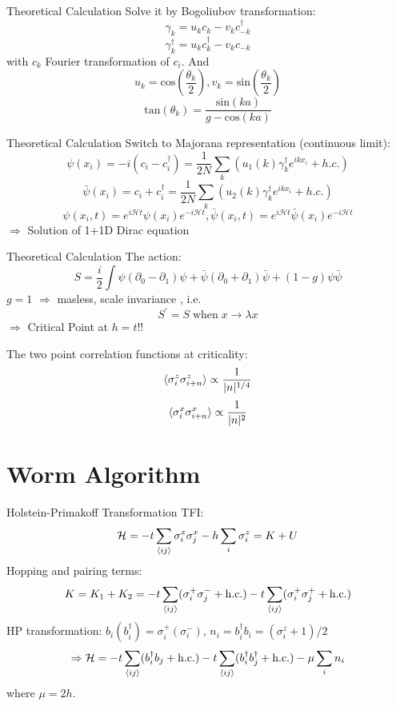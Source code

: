 \documentclass[aspectratio=43]{beamer}
\begin{document}
\begin{frame}{Theoretical Calculation}
Solve it by Bogoliubov transformation:
\[
\gamma_k=u_kc_k-v_kc_{-k}^{\dagger}
\]
\[
\gamma_k^{\dagger}=u_kc_k^{\dagger}-v_kc_{-k}
\]
with $c_k$ Fourier transformation of $c_i$. And
\[
u_k=\mathrm{cos}\left( \frac{\theta_k}{2}\right), v_k=\mathrm{sin}\left( \frac{\theta_k}{2}\right) 
\]
\[
\mathrm{tan}\left(\theta_k\right)=\frac{\mathrm{sin}(ka)}{g-\mathrm{cos}(ka)}
\]
\end{frame}

\begin{frame}{Theoretical Calculation}
Switch to Majorana representation (continuous limit):
\[
\psi(x_i)=-i(c_i-c_i^{\dagger})=\frac{1}{2N}\sum_k(u_1(k)\gamma_k^{\dagger}e^{ikx_i}+h.c.)
\]
\[
\bar{\psi}(x_i)=c_i+c_i^{\dagger}=\frac{1}{2N}\sum_k(u_2(k)\gamma_k^{\dagger}e^{ikx_i}+h.c.)
\]
\[
\psi(x_i,t)=e^{i\mathcal{H}t}\psi(x_i)e^{-i\mathcal{H}t}, \bar{\psi}(x_i,t)=e^{i\mathcal{H}t}\bar{\psi}(x_i)e^{-i\mathcal{H}t}
\]
$\Longrightarrow$ Solution of 1+1D Dirac equation
\end{frame}

\begin{frame}{Theoretical Calculation}
The action:
\[
S=\frac{i}{2}\int\psi(\partial_0-\partial_1)\psi+\bar{\psi}(\partial_0+\partial_1)\bar{\psi}+(1-g)\psi\bar{\psi}
\]
$g=1$ $\Longrightarrow$ masless, scale invariance , i.e.
\[
S^{\prime}=S \; \mathrm{when} \; x\rightarrow \lambda x
\]
$\Longrightarrow$ Critical Point at $h=t$!!
\end{frame}

\begin{frame}
The two point correlation functions at criticality:
\[
\braket{\sigma_i^z\sigma_{i+n}^z}\propto\frac{1}{|n|^{1/4}}
\]
\[
\braket{\sigma_i^x\sigma_{i+n}^x}\propto\frac{1}{|n|^2}
\]
\end{frame}

\section{Worm Algorithm}
\begin{frame}{Holstein-Primakoff Transformation}
  TFI:
  \[
    \mathcal{H} = -t\sum_{\braket{ij}}\sigma_i^x\sigma_j^x - h\sum_{i}\sigma_i^z = K+U
  \]
  Hopping and pairing terms:
  \[
    K = K_1+K_2 = -t\sum_{\braket{ij}}(\sigma_i^+\sigma_j^-+\text{h.c.})-t\sum_{\braket{ij}}(\sigma_i^+\sigma_j^++\text{h.c.})
  \]
  HP transformation: $b_i(b_i^\dag) = \sigma_i^+(\sigma_i^-)$, $n_i = b_i^\dag b_i = (\sigma_i^z+1)/2$
  \[
    \Rightarrow \mathcal{H} = -t\sum_{\braket{ij}}(b_i^\dag b_j+\text{h.c.})-t\sum_{\braket{ij}}(b_i^\dag b_j^\dag+\text{h.c.})-\mu\sum_{i}n_i
  \]
  where $\mu = 2h$.
\end{frame}
\end{document}
